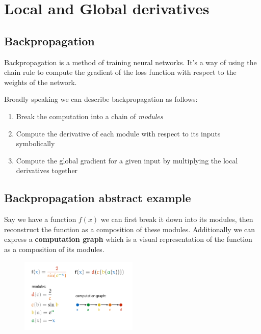 \documentclass[12pt]{article}
\begin{document}
\section{Local and Global derivatives}

\subsection{Backpropagation}

\begin{definition}[Backpropagation]
    Backpropagation is a method of training neural networks. It's a way of using the chain rule to compute the gradient of the loss function with respect to the weights of the network.
\end{definition}

Broadly speaking we can describe backpropagation as follows: 
\begin{enumerate}[leftmargin=*, noitemsep]
    \item Break the computation into a chain of \textit{modules} 
    \item Compute the derivative of each module with respect to its inputs symbolically
    \item Compute the global gradient for a given input by multiplying the local derivatives together
\end{enumerate}
\newpage
\subsection{Backpropagation abstract example}

Say we have a function $f(x)$ we can first break it down into its modules, then reconstruct the function as a composition of these modules. Additionally we can express a \textbf{computation graph} which is a visual representation of the function as a composition of its modules.

\begin{figure}[!h]
    \centering
    \includegraphics[width=0.5\textwidth]{assets/backpropbasic.png}
\end{figure}
\end{document}
